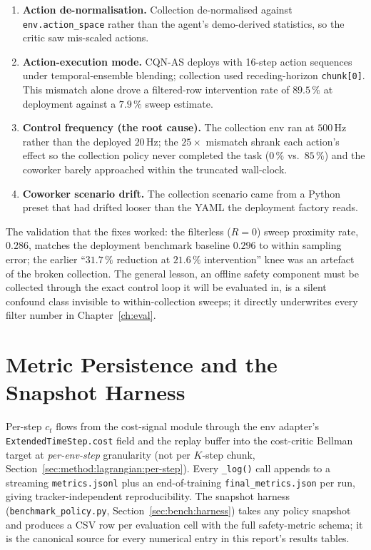 \documentclass[11pt,a4paper]{report}
\newcommand{\cqnas}{CQN-AS}
\begin{document}
\begin{enumerate}[topsep=2pt,itemsep=2pt]
\item \textbf{Action de-normalisation.} Collection de-normalised
  against \texttt{env.action\_space} rather than the agent's
  demo-derived statistics, so the critic saw mis-scaled actions.
\item \textbf{Action-execution mode.} \cqnas{} deploys with
  16-step action sequences under temporal-ensemble blending;
  collection used receding-horizon \texttt{chunk[0]}. This mismatch
  alone drove a filtered-row intervention rate of $89.5\,\%$ at
  deployment against a $7.9\,\%$ sweep estimate.
\item \textbf{Control frequency (the root cause).} The collection
  env ran at $500$\,Hz rather than the deployed $20$\,Hz; the
  $25\times$ mismatch shrank each action's effect so the collection
  policy never completed the task ($0\,\%$ vs.\ $85\,\%$) and the
  coworker barely approached within the truncated wall-clock.
\item \textbf{Coworker scenario drift.} The collection scenario came
  from a Python preset that had drifted looser than the YAML the
  deployment factory reads.
\end{enumerate}

The validation that the fixes worked: the filterless ($R = 0$) sweep
proximity rate, $0.286$, matches the deployment benchmark baseline
$0.296$ to within sampling error; the earlier ``$31.7\,\%$ reduction
at $21.6\,\%$ intervention'' knee was an artefact of the broken
collection. The general lesson, an offline safety component must be
collected through the exact control loop it will be evaluated in,
is a silent confound class invisible to within-collection sweeps; it
directly underwrites every filter number in Chapter~\ref{ch:eval}.



\section{Metric Persistence and the Snapshot Harness}
\label{sec:impl:metrics}

Per-step $c_t$ flows from the cost-signal module through the env
adapter's \texttt{ExtendedTimeStep.cost} field and the replay
buffer into the cost-critic Bellman target at \emph{per-env-step}
granularity (not per $K$-step chunk,
Section~\ref{sec:method:lagrangian:per-step}). Every
\texttt{\_log()} call appends to a streaming \texttt{metrics.jsonl}
plus an end-of-training \texttt{final\_metrics.json} per run, giving
tracker-independent reproducibility. The snapshot harness
(\texttt{benchmark\_policy.py}, Section~\ref{sec:bench:harness})
takes any policy snapshot and produces a CSV row per evaluation cell
with the full safety-metric schema; it is the canonical source for
every numerical entry in this report's results tables.
\end{document}

